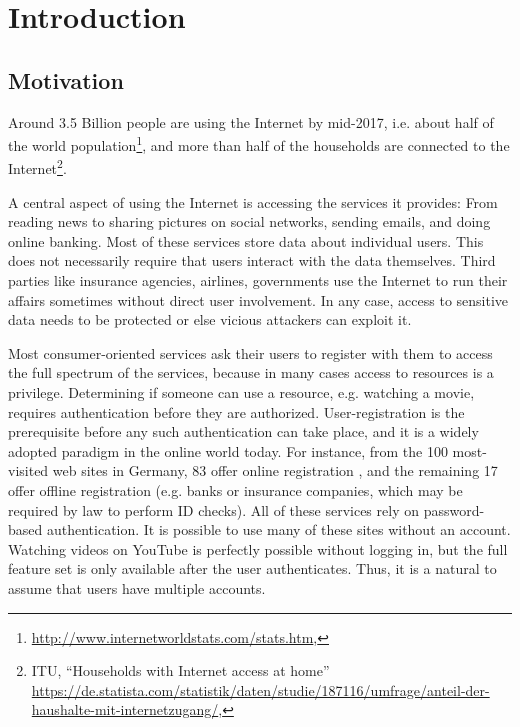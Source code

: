 
\chapter[Introduction]{Introduction}\label{chap:intro}

\section{Motivation}
Around 3.5 Billion people are using the Internet by mid-2017, i.e. about half of the world population\footnote{\url{http://www.internetworldstats.com/stats.htm}, }, and more than half of the households are connected to the Internet\footnote{ITU, ``Households with Internet access at home'' \url{https://de.statista.com/statistik/daten/studie/187116/umfrage/anteil-der-haushalte-mit-internetzugang/}, }.

A central aspect of using the Internet is accessing the services it provides: From reading news to sharing pictures on social networks, sending emails, and doing online banking. Most of these services store data about individual users. This does not necessarily require that users interact with the data themselves. Third parties like insurance agencies, airlines, governments use the Internet to run their affairs sometimes without direct user involvement. In any case, access to sensitive data needs to be protected or else vicious attackers can exploit it. 

Most consumer-oriented services ask their users to register with them to access the full spectrum of the services, because in many cases access to resources is a privilege. Determining if someone can use a resource, e.g. watching a movie, requires authentication before they are authorized. User-registration is the prerequisite before any such authentication can take place, and it is a widely adopted paradigm in the online world today. For instance, from the 100 most-visited web sites in Germany, 83 offer online registration \cite{Seitz2017PoliciesReuse}, and the remaining 17 offer offline registration (e.g. banks or insurance companies, which may be required by law to perform ID checks). All of these services rely on password-based authentication. It is possible to use many of these sites without an account. Watching videos on YouTube is perfectly possible without logging in, but the full feature set is only available after the user authenticates. Thus, it is a natural to assume that users have multiple accounts. 


